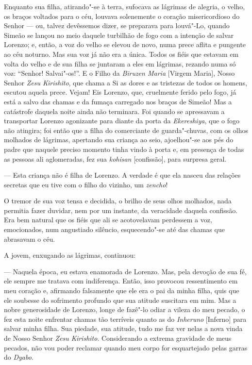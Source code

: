 Enquanto sua filha, atirando"-se à terra, sufocava as lágrimas de
alegria, o velho, os braços voltados para o céu, louvava solenemente o
coração misericordioso do Senhor --- ou, talvez devêssemos dizer, se
preparava para louvá"-Lo, quando Simeão se lançou no meio daquele
turbilhão de fogo com a intenção de salvar Lorenzo; e, então, a voz do
velho se elevou de novo, numa prece aflita e pungente ao céu noturno.
Mas sua voz já não era a única. Todos os fiéis que estavam em volta do
velho e de sua filha se juntaram a eles em lágrimas, rezando numa só
voz: ``Senhor! Salvai"-os!''. E o Filho da \textit{Biruzen Maria} [Virgem
Maria], Nosso Senhor \textit{Zesu Kirishito}, que chama a Si as dores e
as tristezas de todos os homens, escutou aquela prece. Vejam! Eis
Lorenzo, que, cruelmente ferido pelo fogo, já está a salvo das chamas e
da fumaça carregado nos braços de Simeão! Mas a catástrofe daquela
noite ainda não terminara. Foi quando se apressavam a transportar
Lorenzo agonizante para diante da porta da \textit{Ekereshiya}, que o
fogo não atingira; foi então que a filha do comerciante de
guarda"-chuvas, com os olhos molhados de lágrimas, apertando sua criança
ao seio, ajoelhou"-se aos pés do padre que naquele preciso momento tinha
vindo à porta e, em presença de todas as pessoas ali aglomeradas, fez
sua \textit{kohisan} [confissão], para surpresa geral.

--- Esta criança não é filha de Lorenzo. A verdade é que ela nasceu das
relações secretas que eu tive com o filho do vizinho, um
\textit{zencho}!

O tremor de sua voz tensa e decidida, o brilho de seus olhos molhados,
nada permitia fazer duvidar, nem por um instante, da veracidade daquela
confissão. Era bem natural que os fiéis que ali se acotovelavam
perdessem a voz, emocionados, num angustiado silêncio, esquecendo"-se
até das chamas que abrasavam o céu.

A jovem, enxugando as lágrimas, continuou:

--- Naquela época, eu estava enamorada de Lorenzo. Mas, pela devoção de
sua fé, ele sempre me tratava com indiferença. Então, isso provocou
ressentimento em meu coração e, afirmando falsamente que ele era o pai
da minha filha, quis que ele soubesse do sofrimento profundo que sua
atitude suscitara em mim. Mas a nobre generosidade de Lorenzo, longe de
fazê"-lo odiar a vileza do meu pecado, o fez esta noite enfrentar chamas
tão terríveis quanto as do \textit{Inheruno} [Inferno] para salvar
minha filha. Sua piedade, sua atitude, tudo me faz ver nelas a nova
vinda de Nosso Senhor \textit{Zesu Kirishito}. Considerando a extrema
gravidade de meus pecados, não vou poder reclamar quando meu corpo for
esquartejado pelas garras do \textit{Dyabo}. 

